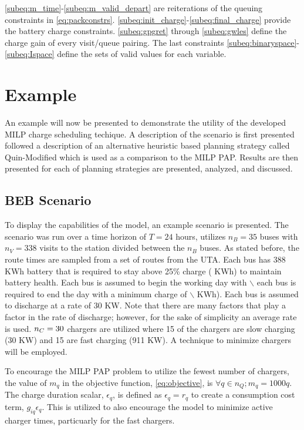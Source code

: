 \documentclass[utf8]{FrontiersinHarvard}
\newcommand{\A}{35 }                                                            %
\newcommand{\N}{338 }                                                           %
\newcommand{\acharge}{0.9}                                                      %
\newcommand{\bcharge}{0.7 }                                                     %
\newcommand{\mincharge}{25\% }                                                  %
\newcommand{\minchargeD}{0.25 }                                                 %
\newcommand{\batsize}{388 }                                                     %
\newcommand{\fast}{15 }                                                         %
\newcommand{\slow}{15 }                                                         %
\newcommand{\fasts}{911 }                                                       %
\newcommand{\slows}{30 }                                                        %
\begin{document}
\autoref{subeq:m_time}-\autoref{subeq:m_valid_depart} are reiterations of the queuing constraints in
\autoref{eq:packconstrs}. \autoref{subeq:init_charge}-\autoref{subeq:final_charge} provide the battery charge
constraints. \autoref{subeq:gpgret} through \autoref{subeq:gwles} define the charge gain of every visit/queue
pairing. The last constraints \autoref{subeq:binaryspace}-\autoref{subeq:Ispace} define the sets of valid values for each
variable.
\section{Example}
\label{sec:example}
An example will now be presented to demonstrate the utility of the developed MILP charge scheduling techique. A
description of the scenario is first presented followed a description of an alternative heuristic based planning
strategy called Quin-Modified which is used as a comparison to the MILP PAP. Results are then presented for each of
planning strategies are presented, analyzed, and discussed.

\subsection{BEB Scenario}
\label{beb-scenario}
To display the capabilities of the model, an example scenario is presented. The scenario was run over a time horizon of
\(T=24\) hours, utilizes \(n_B = \A\) buses with \(n_V = \N\) visits to the station divided between the \(n_B\) buses. As stated
before, the route times are sampled from a set of routes from the UTA. Each bus has \batsize KWh battery that is
required to stay above \mincharge charge (\fpeval{\batsize * \minchargeD} KWh) to maintain battery health. Each bus is
assumed to begin the working day with \fpeval{\acharge*100}$\backslash$%
each bus is required to end the day with a minimum charge of \fpeval{\bcharge * 100}$\backslash$%
KWh). Each bus is assumed to discharge at a rate of 30 KW. Note that there are many factors that play a factor in the
rate of discharge; however, for the sake of simplicity an average rate is used. \(n_C = \fpeval{\fast + \slow}\) chargers
are utilized where \slow of the chargers are slow charging (\slows KW) and \fast are fast charging (\fasts KW). A
technique to minimize chargers will be employed.

To encourage the MILP PAP problem to utilize the fewest number of chargers, the value of \(m_q\) in the objective
function, \autoref{eq:objective}, is \(\forall q \in n_Q; m_q = 1000q\). The charge duration scalar, \(\epsilon_q\), is defined as
\(\epsilon_q = r_q\) to create a consumption cost term, \(g_{iq}\epsilon_q\). This is utilized to also encourage the model to minimize
active charger times, particuarly for the fast chargers.
\end{document}
